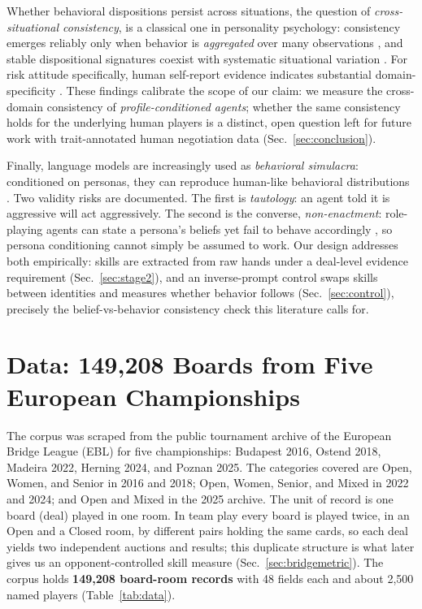 \documentclass[runningheads]{llncs}
\begin{document}
Whether behavioral dispositions persist across situations, the question
of \emph{cross-situational consistency}, is a classical one in
personality psychology: consistency emerges reliably only when behavior
is \emph{aggregated} over many observations \cite{epstein1979stability},
and stable dispositional signatures coexist with systematic situational
variation \cite{mischel1995cognitive}. For risk attitude specifically,
human self-report evidence indicates substantial domain-specificity
\cite{weber2002domain}. These findings calibrate the scope of our claim:
we measure the cross-domain consistency of \emph{profile-conditioned
agents}; whether the same consistency holds for the underlying human
players is a distinct, open question left for future work with
trait-annotated human negotiation data (Sec.~\ref{sec:conclusion}).

Finally, language models are increasingly used as \emph{behavioral
simulacra}: conditioned on personas, they can reproduce human-like
behavioral distributions
\cite{park2023generative,argyle2023out,aher2023using}. Two validity
risks are documented. The first is \emph{tautology}: an agent told it
is aggressive will act aggressively. The second is the converse, \emph{non-enactment}: role-playing agents can state a persona's beliefs
yet fail to behave accordingly \cite{mannekote2025roleplaying}, so
persona conditioning cannot simply be assumed to work. Our design
addresses both empirically: skills are extracted from raw hands under a
deal-level evidence requirement (Sec.~\ref{sec:stage2}), and an
inverse-prompt control swaps
skills between identities and measures whether behavior follows
(Sec.~\ref{sec:control}), precisely the belief-vs-behavior
consistency check this literature calls for.

\section{Data: 149{,}208 Boards from Five European Championships}\label{sec:data}

The corpus was scraped from the public tournament archive of the
European Bridge League (EBL) for five championships: Budapest 2016,
Ostend 2018, Madeira 2022, Herning 2024, and Poznan 2025. The
categories covered are Open, Women, and Senior in 2016 and 2018; Open,
Women, Senior, and Mixed in 2022 and 2024; and Open and Mixed in the
2025 archive. The unit of record is one board (deal) played in one room. In
team play every board is played twice, in an Open and a Closed room, by
different pairs holding the same cards, so each deal yields two
independent auctions and results; this duplicate structure is what
later gives us an opponent-controlled skill measure
(Sec.~\ref{sec:bridgemetric}). The corpus holds \textbf{149{,}208
board-room records} with 48 fields each and about 2{,}500 named
players (Table~\ref{tab:data}).
\end{document}
